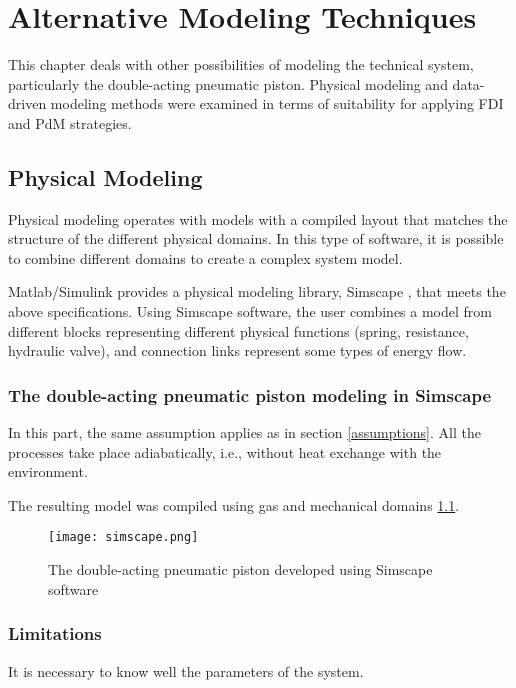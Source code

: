 \chapter{Alternative Modeling Techniques}\label{ch:alt_model}

This chapter deals with other possibilities of modeling the technical
system, particularly the double-acting pneumatic piston. Physical modeling
and data-driven modeling methods were examined in terms of suitability for
applying FDI and PdM strategies.

\section{Physical Modeling}
Physical modeling operates with models with a compiled layout that matches
the structure of the different physical domains. In this type of software,
it is possible to combine different domains to create a complex system
model.

Matlab/Simulink provides a physical modeling library, Simscape
\cite{simscape}, that meets
the above specifications. Using Simscape software, the user combines a
model from different blocks representing different physical functions
(spring, resistance, hydraulic valve), and connection links represent some
types of energy flow.



\subsection{The double-acting pneumatic piston modeling in Simscape}

In this part, the same assumption applies as in section \ref{assumptions}. All the
processes take place adiabatically, i.e., without heat exchange with the
environment. 

The resulting model was compiled using gas and mechanical domains \ref{fig:simscape}.

\begin{figure}[h!]
    \centering
    \texttt{[image: simscape.png]}
    \caption{The double-acting pneumatic piston developed using Simscape
    software}
    \label{fig:simscape}
\end{figure}


\subsection{Limitations}

It is necessary to know well the parameters of the system.

